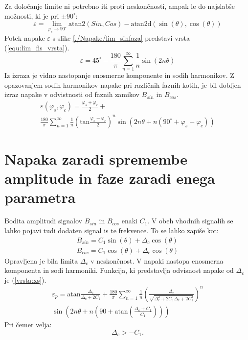 Za določanje limite ni potrebno iti proti neskončnosti, ampak le do najslabše možnosti, ki je pri $\pm 90^\circ$:
\begin{equation}
\label{equ:fis_lim}
\varepsilon = \lim_{\varphi_{s} \rightarrow 90^\circ} \mathrm{atan2}(Sin ,Cos)- \mathrm{atan2d}(\sin(\theta),\cos(\theta))
\end{equation}
Potek napake $\varepsilon$ s slike \ref{./Napake/lim_sinfaza} predstavi vrsta (\ref{equ:lim_fis_vrsta}).
\begin{equation}
\label{equ:lim_fis_vrsta}
\varepsilon = 45^\circ - \frac{180}{\pi}\sum_{n=1}^{\infty}\frac{1}{n} \sin (2n \theta)
\end{equation} 
Iz  izraza je vidno nastopanje enosmerne komponente in sodih harmonikov. Z opazovanjem sodih harmonikov napake pri različnih faznih kotih, je bil dobljen izraz napake v odvistnosti od faznih zamikov $B_{sin}$ in
$B_{cos}$.
\begin{multline}
\label{equ:fis_err}
\varepsilon(\varphi_{s},\varphi_{c}) = \frac{\varphi_{s}+\varphi_{c}}{2}+\\ \frac{180}{\pi}\sum_{n=1}^{\infty}\frac{1}{n} (\mathrm{tan}\frac{\varphi_{s}-\varphi_{c}}{2})^n \sin (2n \theta+n(90^\circ +\varphi_{s}+\varphi_{c}))
\end{multline}

\section{Napaka zaradi spremembe amplitude in faze zaradi enega parametra}
\label{izpeljava_atan_napake_staticne}
Bodita amplitudi signalov $B_{sin}$ in $B_{cos}$ enaki $C_1$. V obeh vhodnih signalih se lahko pojavi tudi dodaten signal is te frekvence. To se lahko zapiše kot:
\begin{eqnarray}
\label{xs_analit}
B_{sin} = C_1 \sin(\theta) + \Delta_c \cos(\theta) \\
B_{cos} = C_1 \cos(\theta) + \Delta_c \cos(\theta)
\end{eqnarray}
Opravljena je bila limita $\Delta_c$ v neskončnost. V napaki nastopa enosmerna komponenta in sodi harmoniki. Funkcija, ki predstavlja odvisnost napake od $\Delta_c$ je (\ref{vrsta:xs}).
\begin{equation}
	\label{vrsta:xs}
	\begin{split}
	\varepsilon_p = \mathrm{atan}\frac{\Delta_c}{\Delta_c+2C_1}+\frac{180}{\pi} \sum_{n=1}^{\infty}\frac{1}{n} (\frac{\Delta_c}{\sqrt{\Delta_c^2+2 C_1\Delta_c+2C_1^2}})^n
	\\\sin (2n \theta+n (90+ \mathrm{ atan}(\frac{\Delta_c+C_1}{C_1})))\end{split}
\end{equation}
Pri čemer velja:
$$\Delta_c > -C_1.$$

